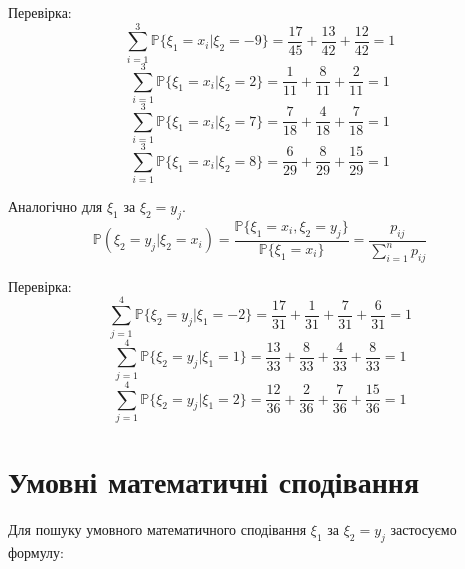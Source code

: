 \documentclass[14pt, a4paper, ukrainian]{extreport}
\begin{document}
	Перевірка:
	$$ \sum_{i=1}^{3}\mathbb{P}\{\xi_1 = x_i | \xi_2=-9\} = \frac{17}{45} + \frac{13}{42} + \frac{12}{42} = 1$$
	$$ \sum_{i=1}^{3}\mathbb{P}\{\xi_1 = x_i | \xi_2=2\} = 
	\frac{1}{11} + \frac{8}{11} + \frac{2}{11} = 1$$
	$$ \sum_{i=1}^{3}\mathbb{P}\{\xi_1 = x_i | \xi_2=7\} = 
	\frac{7}{18} + \frac{4}{18} + \frac{7}{18} = 1$$
	$$ \sum_{i=1}^{3}\mathbb{P}\{\xi_1 = x_i | \xi_2=8\} = \frac{6}{29} + \frac{8}{29} + \frac{15}{29} = 1$$
	
	Аналогічно для $\xi_1$ за $\xi_2 = y_j$.
	$$\mathbb{P}(\xi_2=y_j|\xi_2=x_i) = \frac{\mathbb{P}\{ \xi_1 = x_i, \xi_2 = y_j\}}{\mathbb{P}\{\xi_1=x_i\}} = \frac{p_{ij}}{\sum_{i=1}^{n}p_{ij}}$$
	
	\begin{table}[H]
		\caption{\label{tab:py|px}Умовні ряди розподілу для $\xi_2$ за $\xi_1 = x_i$}
		\begin{center}
		\end{center}
	\end{table}
	
	
	Перевірка:
	$$ \sum_{j=1}^{4}\mathbb{P}\{\xi_2 = y_j | \xi_1=-2\} = \frac{17}{31} + \frac{1}{31} + \frac{7}{31} + \frac{6}{31}= 1$$
	$$ \sum_{j=1}^{4}\mathbb{P}\{\xi_2 = y_j | \xi_1=1\} = \frac{13}{33} + \frac{8}{33} + \frac{4}{33} + \frac{8}{33} = 1$$
	$$ \sum_{j=1}^{4}\mathbb{P}\{\xi_2 = y_j | \xi_1=2\} = \frac{12}{36} + \frac{2}{36} + \frac{7}{36} + \frac{15}{36} = 1$$
	
	\section{Умовні математичні сподівання}
	
	Для пошуку умовного математичного сподівання $\xi_1$ за $\xi_2=y_j$ застосуємо формулу:
	
\end{document}

